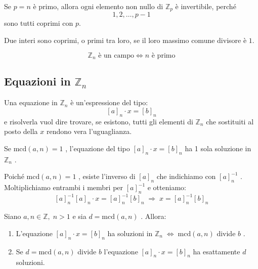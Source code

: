 \documentclass[
  a4paper,
]{article}
\providecommand{\tightlist}{%
  \setlength{\itemsep}{0pt}\setlength{\parskip}{0pt}}
\providecommand{\tightlist}{}
\begin{document}
\begin{propositionbox}[Corollario]
Se \(p=n\) è primo, allora ogni elemento non nullo di \(\mathbb Z_p\) è
invertibile, perché \[
1,2,\dots,p-1
\] sono tutti coprimi con \(p\).
\end{propositionbox}

\begin{notebox}
Due interi sono coprimi, o primi tra loro, se il loro massimo comune
divisore è \(1\).
\end{notebox}

\begin{propositionbox}[Corollario]
\[
\mathbb Z_n \text{ è un campo}
\iff
n \text{ è primo}
\]
\end{propositionbox}

\hypertarget{equazioni-in-mathbbz_n}{%
\subsection{\texorpdfstring{Equazioni in
\(\mathbb{Z}_n\)}{Equazioni in \textbackslash mathbb\{Z\}\_n}}\label{equazioni-in-mathbbz_n}}

\begin{definitionbox}
Una equazione in \(\mathbb{Z}_n\) è un'espressione del tipo: \[
[a]_n \cdot x = [b]_n
\] e risolverla vuol dire trovare, se esistono, tutti gli elementi di
\(\mathbb{Z}_n\) che sostituiti al posto della \(x\) rendono vera
l'uguaglianza.
\end{definitionbox}

\begin{propositionbox}
Se \(\text{mcd}(a, n) = 1\) , l'equazione del tipo
\([a]_n \cdot x = [b]_n\) ha 1 sola soluzione in \(\mathbb{Z}_n\) .
\end{propositionbox}

\begin{proofbox}
Poiché \(\text{mcd}(a, n) = 1\) , esiste l'inverso di \([a]_n\) che
indichiamo con \([a]_n^{-1}\) . Moltiplichiamo entrambi i membri per
\([a]_n^{-1}\) e otteniamo: \[
[a]_n^{-1}[a]_n \cdot x = [a]_n^{-1} [b]_n \; \Longrightarrow \; x =  [a]_n^{-1} [b]_n
\]
\end{proofbox}

\begin{teoremabox}
Siano \(a,n \in \mathbb{Z}, \; n > 1\) e sia \(d = \text{mcd}(a, n)\) .
Allora:

\begin{enumerate}
\def\labelenumi{\arabic{enumi}.}
\tightlist
\item
  L'equazione \([a]_n \cdot x = [b]_n\) ha soluzioni in
  \(\mathbb{Z}_n \; \iff \; \text{mcd}(a, n)\) divide \(b\) .
\item
  Se \(d = \text{mcd}(a, n)\) divide \(b\) l'equazione
  \([a]_n \cdot x = [b]_n\) ha esattamente \(d\) soluzioni.
\end{enumerate}
\end{teoremabox}
\end{document}
